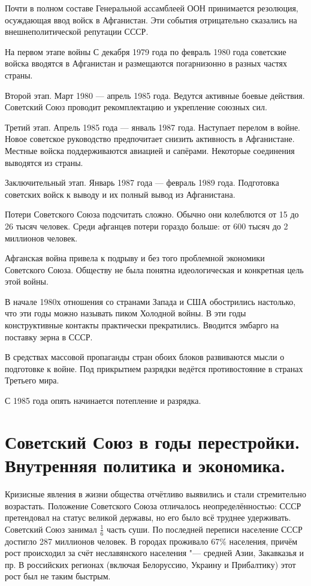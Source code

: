 \documentclass{article}
\begin{document}
Почти в полном составе Генеральной ассамблеей ООН принимается резолюция, осуждающая ввод войск в Афганистан. Эти события отрицательно сказались на внешнеполитической репутации СССР.

На первом этапе войны С декабря 1979 года по февраль 1980 года советские войска вводятся в Афганистан и размещаются погарнизонно в разных частях страны.

Второй этап. Март 1980 --- апрель 1985 года. Ведутся активные боевые действия. Советский Союз проводит рекомплектацию и укрепление союзных сил.

Третий этап. Апрель 1985 года --- янваль 1987 года. Наступает перелом в войне. Новое советское руководство предпочитает снизить активность в Афганистане. Местные войска поддерживаются авиацией и сапёрами. Некоторые соединения выводятся из страны.

Заключительный этап. Январь 1987 года --- февраль 1989 года. Подготовка советских войск к выводу и их полный вывод из Афганистана.

Потери Советского Союза подсчитать сложно. Обычно они колеблются от 15 до 26 тысяч человек. Среди афганцев потери гораздо больше: от 600 тысяч до 2 миллионов человек.

Афганская война привела к подрыву и без того проблемной экономики Советского Союза. Обществу не была понятна идеологическая и конкретная цель этой войны.

В начале 1980х отношения со странами Запада и США обострились настолько, что эти годы можно называть пиком Холодной войны. В эти годы конструктивные контакты практически прекратились. Вводится эмбарго на поставку зерна в СССР.

В средствах массовой пропаганды стран обоих блоков развиваются мысли о подготовке к войне. Под прикрытием разрядки ведётся противостояние в странах Третьего мира.

С 1985 года опять начинается потепление и разрядка.

\section{Советский Союз в годы перестройки. Внутренняя политика и экономика.}
Кризисные явления в жизни общества отчётливо выявились и стали стремительно возрастать. Положение Советского Союза отличалось неопределённостью: СССР претендовал на статус великой державы, но его было всё труднее удерживать. Советский Союз занимал $\frac{1}{6}$ часть суши. По последней переписи население СССР достигло 287 миллионов человек. В городах проживало $67\%$ населения, причём рост происходил за счёт неславянского населения "--- средней Азии, Закавказья и пр. В российских регионах (включая Белоруссию, Украину и Прибалтику) этот рост был не таким быстрым.
\end{document}
